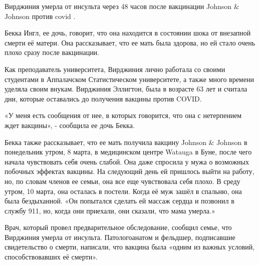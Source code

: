 Вирджиния умерла от инсульта через 48 часов после вакцинации Johnson \& Johnson
против covid .

Бекка Ингл, ее дочь, говорит, что она находится в состоянии шока от внезапной
смерти её матери. Она рассказывает, что ее мать была здорова, но ей стало очень
плохо сразу после вакцинации.

Как преподаватель университета, Вирджиния лично работала со своими студентами в
Аппалачском Статистическом университете, а также много времени уделяла своим
внукам. Вирджиния Эллигтон, была в возрасте 63 лет и считала дни, которые
оставались до получения вакцины против COVID.

«У меня есть сообщения от нее, в которых говорится, что она с нетерпением ждет
вакцины», - сообщила ее дочь Бекка.

Бекка также рассказывает, что ее мать получила вакцину Johnson \& Johnson в
понедельник утром, 8 марта, в медицинском центре Watauga в Буне, после чего
начала чувствовать себя очень слабой. Она даже спросила у мужа о возможных
побочных эффектах вакцины. На следующий день ей пришлось выйти на работу, но, по
словам членов ее семьи, она все еще чувствовала себя плохо. В среду утром, 10
марта, она осталась в постели. Когда её муж зашёл в спальню, она была
бездыханной. «Он попытался сделать ей массаж сердца и позвонил в службу 911, но,
когда они приехали, они сказали, что мама умерла.»

Врач, который провел предварительное обследование, сообщил семье, что Вирджиния
умерла от инсульта. Патологоанатом и фельдшер, подписавшие свидетельство о
смерти, написали, что вакцина была «одним из важных условий, способствовавших её
смерти».

